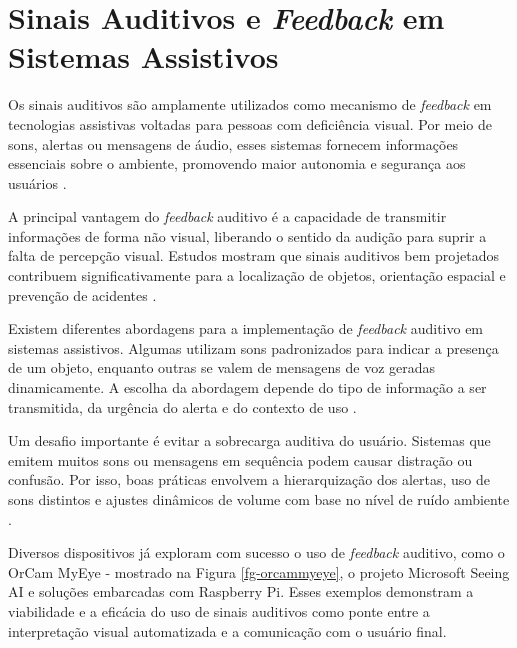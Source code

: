 \section{\textbf{Sinais Auditivos e \textit{Feedback} em Sistemas Assistivos}}

Os sinais auditivos são amplamente utilizados como mecanismo de \textit{feedback} em tecnologias assistivas voltadas para pessoas com deficiência visual. Por meio de sons, alertas ou mensagens de áudio, esses sistemas fornecem informações essenciais sobre o ambiente, promovendo maior autonomia e segurança aos usuários \cite{Milella2014}.

A principal vantagem do \textit{feedback} auditivo é a capacidade de transmitir informações de forma não visual, liberando o sentido da audição para suprir a falta de percepção visual. Estudos mostram que sinais auditivos bem projetados contribuem significativamente para a localização de objetos, orientação espacial e prevenção de acidentes \cite{Nguyen2020-feedback_strategies}.

Existem diferentes abordagens para a implementação de \textit{feedback} auditivo em sistemas assistivos. Algumas utilizam sons padronizados para indicar a presença de um objeto, enquanto outras se valem de mensagens de voz geradas dinamicamente. A escolha da abordagem depende do tipo de informação a ser transmitida, da urgência do alerta e do contexto de uso \cite{Spagnol2018}.

Um desafio importante é evitar a sobrecarga auditiva do usuário. Sistemas que emitem muitos sons ou mensagens em sequência podem causar distração ou confusão. Por isso, boas práticas envolvem a hierarquização dos alertas, uso de sons distintos e ajustes dinâmicos de volume com base no nível de ruído ambiente \cite{Akbar2022}.

Diversos dispositivos já exploram com sucesso o uso de \textit{feedback} auditivo, como o OrCam MyEye - mostrado na Figura \ref{fg-orcammyeye}, o projeto Microsoft Seeing AI e soluções embarcadas com Raspberry Pi. Esses exemplos demonstram a viabilidade e a eficácia do uso de sinais auditivos como ponte entre a interpretação visual automatizada e a comunicação com o usuário final.


